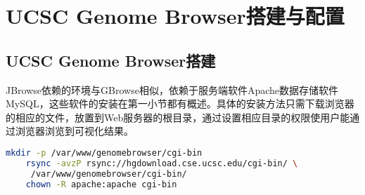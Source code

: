 	\section{UCSC Genome Browser搭建与配置}
	\subsection{UCSC Genome Browser搭建}
	JBrowse依赖的环境与GBrowse相似，依赖于服务端软件Apache数据存储软件MySQL，这些软件的安装在第一小节都有概述。具体的安装方法只需下载浏览器的相应的文件，放置到Web服务器的根目录，通过设置相应目录的权限使用户能通过浏览器浏览到可视化结果。
	\begin{lstlisting}[language=bash]
	mkdir -p /var/www/genomebrowser/cgi-bin
	rsync -avzP rsync://hgdownload.cse.ucsc.edu/cgi-bin/ \
	 /var/www/genomebrowser/cgi-bin/
	chown -R apache:apache cgi-bin
	\end{lstlisting}
	
